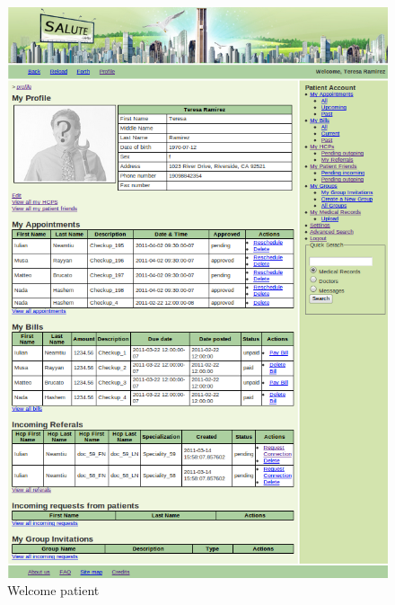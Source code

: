 \begin{figure}
\includegraphics[scale=0.7]{screenshots/patient_profile.png}
\caption{Welcome patient}
\end{figure}
\clearpage
